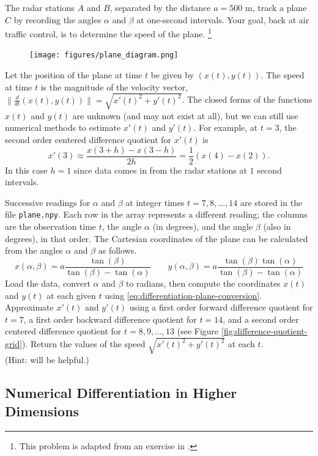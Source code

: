 \begin{problem}
The radar stations $A$ and $B$, separated by the distance $a = 500$ m, track a plane $C$ by recording the angles $\alpha$ and $\beta$ at one-second intervals.
Your goal, back at air traffic control, is to determine the speed of the plane.%
\footnote{This problem is adapted from an exercise in \cite{kiusalaas2013numerical}.}
%
\begin{figure}[H]
    \texttt{[image: figures/plane\_diagram.png]}
\end{figure}
%
Let the position of the plane at time $t$ be given by $(x(t),y(t))$.
The speed at time $t$ is the magnitude of the velocity vector, $\|\frac{d}{dt}(x(t),y(t))\| = \sqrt{x'(t)^2 + y'(t)^2}$.
The closed forms of the functions $x(t)$ and $y(t)$ are unknown (and may not exist at all), but we can still use numerical methods to estimate $x'(t)$ and $y'(t)$.
For example, at $t=3$, the second order centered difference quotient for $x'(t)$ is
\[
x'(3) \approx \frac{x(3+h) - x(3-h)}{2h} = \frac{1}{2}(x(4) - x(2)).
\]
In this case $h=1$ since data comes in from the radar stations at $1$ second intervals.

Successive readings for $\alpha$ and $\beta$ at integer times $t=7,8,\ldots,14$ are stored in the file \texttt{plane.npy}.
Each row in the array represents a different reading; the columns are the observation time $t$, the angle $\alpha$ (in degrees), and the angle $\beta$ (also in degrees), in that order.
The Cartesian coordinates of the plane can be calculated from the angles $\alpha$ and $\beta$ as follows.
\begin{equation}
\label{eq:differentiation-plane-conversion}
x(\alpha, \beta) = a \frac{\tan(\beta)}{\tan(\beta)-\tan(\alpha)}
\qquad
y(\alpha, \beta) = a \frac{\tan(\beta)\tan(\alpha)}{\tan(\beta)-\tan(\alpha)}
\end{equation}
Load the data, convert $\alpha$ and $\beta$ to radians, then compute the coordinates $x(t)$ and $y(t)$ at each given $t$ using \ref{eq:differentiation-plane-conversion}.
Approximate $x'(t)$ and $y'(t)$ using a first order forward difference quotient for $t=7$, a first order backward difference quotient for $t=14$, and a second order centered difference quotient for $t=8,9,\ldots,13$ (see Figure \ref{fig:difference-quotient-grid}).
Return the values of the speed $\sqrt{x'(t)^2+y'(t)^2}$ at each $t$.
\\(Hint:  will be helpful.)
\end{problem}

\subsection*{Numerical Differentiation in Higher Dimensions} %

